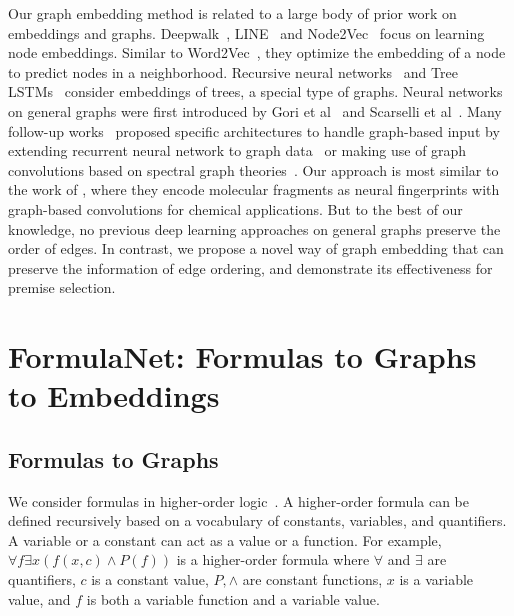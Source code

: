 \documentclass{article}
\begin{document}
Our graph embedding method is related to a large body of
prior work on embeddings and graphs. Deepwalk~\cite{perozzi2014deepwalk}, LINE~\cite{tang2015line} and
Node2Vec~\cite{grover2016node2vec} focus on learning node embeddings. Similar to 
Word2Vec~\cite{mikolov2013distributed,mikolov2013efficient}, they optimize the embedding
of a node to predict nodes in a neighborhood. Recursive neural networks~\cite{goller1996learning, socher2011parsing} and Tree
LSTMs~\cite{tai2015improved} consider embeddings of trees, a special type of graphs.  
Neural networks on general graphs were first introduced by Gori et
al~\cite{gori2005new} and Scarselli et al~\cite{scarselli2009graph}.  Many follow-up
works~\cite{duvenaud2015convolutional, li2015gated, jain2016structural, henaff2015deep, defferrard2016convolutional, kipf2016semi} proposed specific
architectures to handle graph-based input by extending recurrent neural network to graph
data~\cite{gori2005new,li2015gated,jain2016structural} or making use of graph convolutions
based on spectral graph theories~\cite{duvenaud2015convolutional, henaff2015deep,
  defferrard2016convolutional, kipf2016semi, niepert2016learning}. Our approach is most
similar to the work of \cite{duvenaud2015convolutional}, where they encode molecular
fragments as neural fingerprints with graph-based convolutions for chemical applications. 
But to the best of our knowledge, no previous deep learning approaches on general graphs
 preserve the order of edges. In contrast, we propose a novel way of graph embedding that
can preserve the information of edge ordering, and demonstrate its effectiveness for
premise selection. 

\section{FormulaNet: Formulas to Graphs to Embeddings}

\subsection{Formulas to Graphs}

We consider formulas in higher-order logic~\cite{church1940formulation}. A higher-order
formula can be defined recursively based on a vocabulary of constants, variables, and
quantifiers. A variable or a constant can act as a value or a function. For example,
$\forall f \exists x (f(x,c) \wedge P(f))$ is a higher-order formula where $\forall$ and
$\exists$ are quantifiers, $c$ is a constant value, $P, \wedge$ are constant
functions, $x$ is a variable value, and $f$ is both a variable function and a
variable value. 
\end{document}
